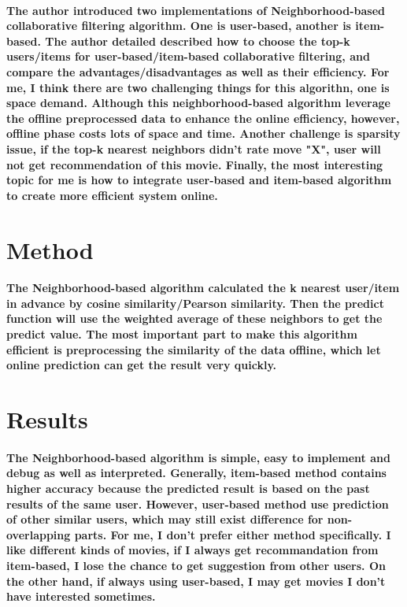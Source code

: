 \documentclass{article}
\begin{document}
\paragraph{The author introduced two implementations of Neighborhood-based collaborative filtering algorithm. One is user-based, another is item-based. The author detailed described how to choose the top-k users/items for user-based/item-based collaborative filtering, and compare the advantages/disadvantages as well as their efficiency. For me, I think there are two challenging things for this algorithn, one is space demand. Although this neighborhood-based algorithm leverage the offline preprocessed data to enhance the online efficiency, however, offline phase costs lots of space and time. Another challenge is sparsity issue, if the top-k nearest neighbors didn't rate move "X", user will not get recommendation of this movie. Finally, the most interesting topic for me is how to integrate user-based and item-based algorithm to create more efficient system online.
}
\section{Method}
\paragraph{
The Neighborhood-based algorithm calculated the k nearest user/item in advance by cosine similarity/Pearson similarity. Then the predict function will use the weighted average of these neighbors to get the predict value. The most important part to make this algorithm efficient is preprocessing the similarity of the data offline, which let online prediction can get the result very quickly.
}
\section{Results}
\paragraph{
The Neighborhood-based algorithm is simple, easy to implement and debug as well as interpreted. Generally, item-based method contains higher accuracy because the predicted result is based on the past results of the same user. However, user-based method use prediction of other similar users, which may still exist difference for non-overlapping parts. For me, I don't prefer either method specifically. I like different kinds of movies, if I always get recommandation from item-based, I lose the chance to get suggestion from other users. On the other hand, if always using user-based, I may get movies I don't have interested sometimes.
}
\end{document}
